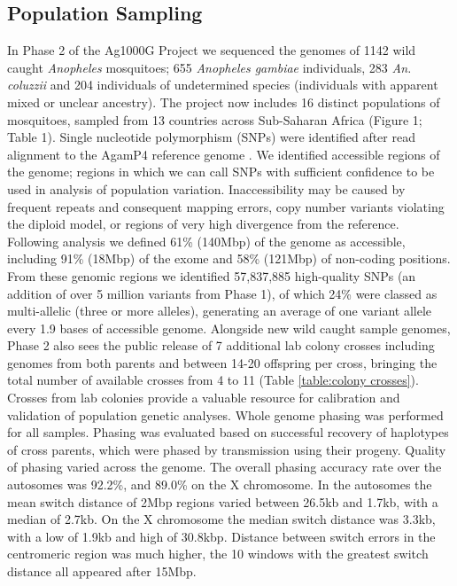\documentclass[a4paper,11pt,abstracton,hidelinks]{scrartcl}
\begin{document}
\subsection*{Population Sampling}
%
In Phase 2 of the Ag1000G Project we sequenced the genomes of 1142 wild caught \emph{Anopheles} mosquitoes; 655 \textit{Anopheles gambiae} individuals, 283 \textit{An. coluzzii} and 204 individuals of undetermined species (individuals with apparent mixed or unclear ancestry).
%
The project now includes 16 distinct populations of mosquitoes, sampled from 13 countries across Sub-Saharan Africa (Figure 1; Table 1). 
%
Single nucleotide polymorphism (SNPs) were identified after read alignment to the AgamP4 reference genome \cite{Holt2002}.
%
We identified accessible regions of the genome; regions in which we can call SNPs with sufficient confidence to be used in analysis of population variation.
%
Inaccessibility may be caused by frequent repeats and consequent mapping errors, copy number variants violating the diploid model, or regions of very high divergence from the reference.
%
Following analysis we defined 61\% (140Mbp) of the genome as accessible, including 91\% (18Mbp) of the exome and 58\% (121Mbp) of non-coding positions.
%
From these genomic regions we identified 57,837,885 high-quality SNPs (an addition of over 5 million variants from Phase 1\cite{Ag1000gConsortium2017}), of which 24\% were classed as multi-allelic (three or more alleles), generating an average of one variant allele every 1.9 bases of accessible genome.
%
Alongside new wild caught sample genomes, Phase 2 also sees the public release of 7 additional lab colony crosses including genomes from both parents and between 14-20 offspring per cross, bringing the total number of available crosses from 4 to 11 (Table \ref{table:colony crosses}).
%
Crosses from lab colonies provide a valuable resource for calibration and validation of population genetic analyses.
%
Whole genome phasing was performed for all samples. 
%
Phasing was evaluated based on successful recovery of haplotypes of cross parents, which were phased by transmission using their progeny.
Quality of phasing varied across the genome. 
%
The overall phasing accuracy rate over the autosomes was 92.2\%, and 89.0\% on the X chromosome.
%
In the autosomes the mean switch distance of 2Mbp regions varied between 26.5kb and 1.7kb, with a median of 2.7kb.
%
On the X chromosome the median switch distance was 3.3kb, with a low of 1.9kb and high of 30.8kbp.
%
Distance between switch errors in the centromeric region was much higher, the 10 windows with the greatest switch distance all appeared after 15Mbp.
\end{document}
